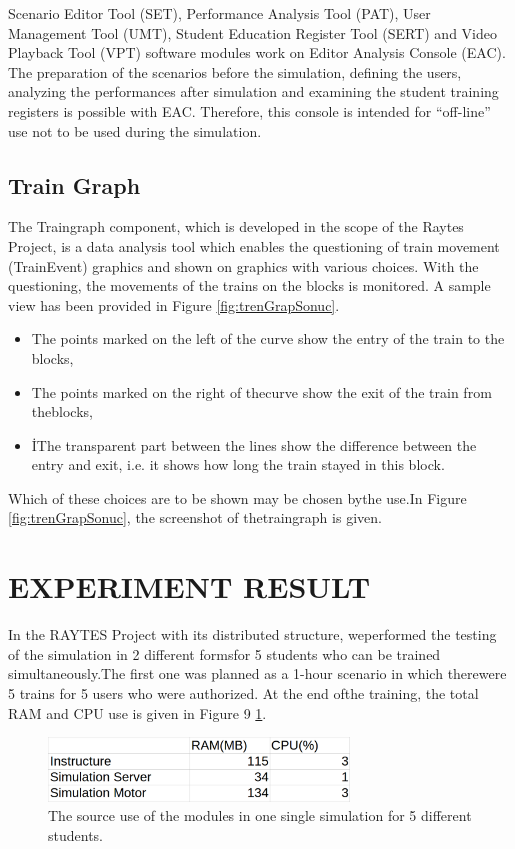 \documentclass[conference]{IEEEtran}
\begin{document}
Scenario Editor Tool (SET), Performance Analysis Tool (PAT), User Management Tool (UMT), Student Education Register Tool (SERT) and Video Playback Tool (VPT) software modules work on Editor Analysis Console (EAC). The preparation of the scenarios before the simulation, defining the users, analyzing the performances after simulation and examining the student training registers is possible with EAC. Therefore, this console is intended for “off-line” use not to be used during the simulation. 

\subsection{Train Graph}
The Traingraph component, which is developed in the scope of the Raytes Project, is a data analysis tool which enables the questioning of train movement (TrainEvent) graphics and shown on graphics with various choices. With the questioning, the movements of the trains on the blocks is monitored. 
A sample view has been provided in Figure \ref{fig:trenGrapSonuc}.


\begin{itemize}
\item The points marked on the left of the curve show the entry of the train to the blocks,
\item The points marked on the right of thecurve show the exit of the train from theblocks,
\item İThe transparent part between the lines show the difference between the entry and exit, i.e. it shows how long the train stayed in this block.
\end{itemize}

Which of these choices are to be shown may be chosen bythe use.In Figure \ref{fig:trenGrapSonuc}, the screenshot of thetraingraph is given.
\section{EXPERIMENT RESULT}
In  the  RAYTES  Project  with  its  distributed  structure,  weperformed the testing of the simulation in 2 different formsfor 5 students who can be trained simultaneously.The first one was planned as a 1-hour scenario in which therewere 5 trains for 5  users who were authorized.   At the end ofthe training, the total RAM and CPU use is given in Figure 9 \ref{fig:hepsibir}.


\begin{figure}[h!]
  \centering
  \includegraphics[width=8cm]{hepsibir.png}
  \caption{The  source use of the modules in one single simulation for 5 different  students.}\label{fig:hepsibir}
  
\end{figure}
\end{document}

